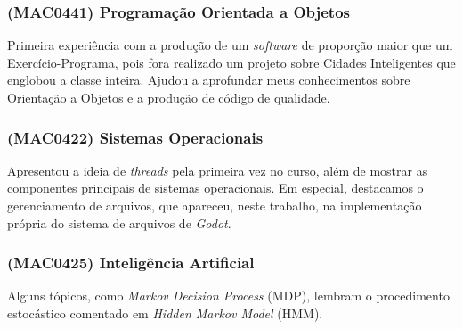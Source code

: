 \subsubsection{(MAC0441) Programação Orientada a Objetos}

Primeira experiência com a produção de um \textit{software} de proporção maior que um Exercício-Programa, pois fora realizado um projeto sobre Cidades Inteligentes que englobou a classe inteira. Ajudou a aprofundar meus conhecimentos sobre Orientação a Objetos e a produção de código de qualidade.

\subsubsection{(MAC0422) Sistemas Operacionais}

Apresentou a ideia de \textit{threads} pela primeira vez no curso, além de mostrar as componentes principais de sistemas operacionais. Em especial, destacamos o gerenciamento de arquivos, que apareceu, neste trabalho, na implementação própria do sistema de arquivos de \textit{Godot}.

\subsubsection{(MAC0425) Inteligência Artificial}

Alguns tópicos, como \textit{Markov Decision Process} (MDP), lembram o procedimento estocástico comentado em \textit{Hidden Markov Model} (HMM).
